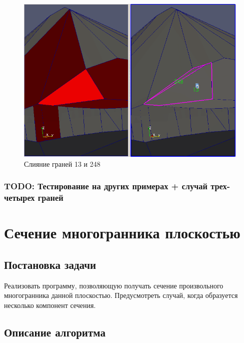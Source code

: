 \documentclass[a4paper,12pt, titlepage]{article}
\begin{document}
\begin{flushleft}
  \begin{figure}[h]
    \includegraphics[clip, width=13cm]{polyhedron-2010-11-25/13-248.png}
    \caption{Слияние граней 13 и 248}\label{poly1-3}
  \end{figure}
\end{flushleft}

\subsubsection{TODO: Тестирование на других примерах + случай трех-четырех граней}




\newpage
\section{Сечение многогранника плоскостью}

\subsection{Постановка задачи}
\begin{flushleft}
	Реализовать программу, позволяющую получать сечение произвольного многогранника
	данной плоскостью. Предусмотреть случай, когда образуется несколько компонент сечения.
\end{flushleft}

\subsection{Описание алгоритма}
\end{document}
